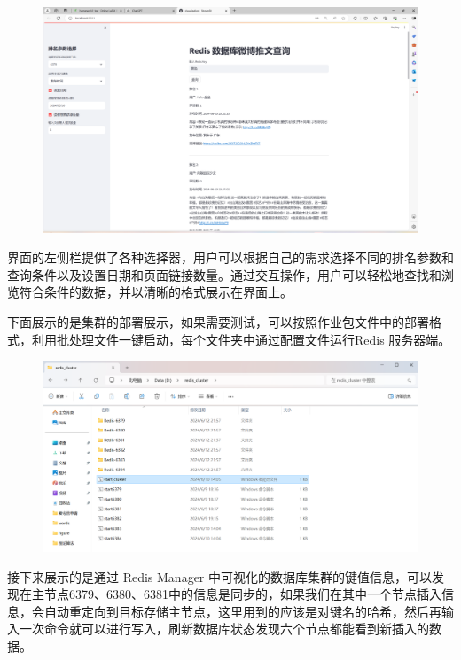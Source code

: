 \documentclass[12pt,hyperref,a4paper,UTF8]{ctexart}
\begin{document}
\begin{figure}[H]
\centering
\includegraphics[width=1\textwidth]{figures/jingse.png}
\end{figure}

界面的左侧栏提供了各种选择器，用户可以根据自己的需求选择不同的排名参数和查询条件以及设置日期和页面链接数量。通过交互操作，用户可以轻松地查找和浏览符合条件的数据，并以清晰的格式展示在界面上。

下面展示的是集群的部署展示，如果需要测试，可以按照作业包文件中的部署格式，利用批处理文件一键启动，每个文件夹中通过配置文件运行Redis 服务器端。

\begin{figure}[H]
\centering
\includegraphics[width=1\textwidth]{figures/cluster.png}
\end{figure}

接下来展示的是通过 Redis Manager 中可视化的数据库集群的键值信息，可以发现在主节点6379、6380、6381中的信息是同步的，如果我们在其中一个节点插入信息，会自动重定向到目标存储主节点，这里用到的应该是对键名的哈希，然后再输入一次命令就可以进行写入，刷新数据库状态发现六个节点都能看到新插入的数据。
\end{document}
